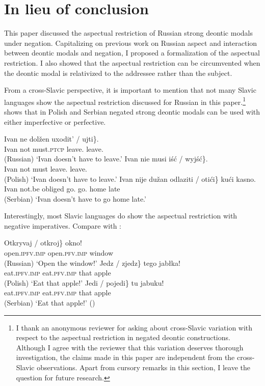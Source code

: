 \documentclass[output=paper,
modfonts,
newtxmath,colorlinks,citecolor=brown
]{langscibook}
\begin{document}
\section{In lieu of conclusion}\label{sect:conclusion}
This paper discussed the aspectual restriction of Russian strong deontic  modals under negation. Capitalizing on previous work on Russian aspect and interaction between deontic modals and negation, I proposed a formalization of the aspectual restriction. I also showed that the aspectual restriction can be circumvented when the deontic modal is relativized to the addressee rather than the subject.

From a cross-Slavic perspective, it is important to mention that not many Slavic languages show the aspectual restriction discussed for Russian in this paper.\footnote{I thank an anonymous reviewer for asking about cross-Slavic variation with respect to the aspectual restriction in negated deontic constructions. Although I agree with the reviewer that this variation deserves thorough investigation, the claims made in this paper are independent from the cross-Slavic observations. Apart from cursory remarks in this section, I leave the question for future research. 
}
 shows that in Polish and Serbian negated strong deontic modals can be used with either imperfective or perfective. 

\ea \label{crossslavdeon} \ea \gll Ivan ne dolžen \minsp{\{} uxodit' / \minsp{*} ujti\}. \\
	Ivan  not must.\textsc{ptcp} {} {leave.\im} {} {} {leave.\p} {} \\ \hfill (Russian) 
	\glt `Ivan doesn't have to leave.' 
	\ex \gll Ivan nie musi \minsp{\{} iść / wyjść\}. \\
	Ivan not must {} {leave.\im} {} {leave.\p} {} \\ \hfill (Polish)
	\glt `Ivan doesn't have to leave.' 
	\ex \gll Ivan nije du\v zan \minsp{\{} odlaziti / otići\} kući kasno. \\
	Ivan not.be obliged {} {go.\im} {} {go.\p} home late \\ \hfill (Serbian)
	\glt `Ivan doesn't have to go home late.' 
	\z \z             
            
\noindent Interestingly, most Slavic languages do show the aspectual restriction with negative imperatives. Compare  with :  

\ea \label{crossslavimp} \ea \gll \minsp{\{} Otkryvaj / otkroj\} okno! \\
  	{} open.\textsc{ipfv.imp} {} open.\textsc{pfv.imp}  window \\ \hfill (Russian)
 	\glt `Open the window!' 
    \ex \gll \minsp{\{} Jedz / zjedz\} tego jabłka! \\
	{} eat.\textsc{ipfv.imp} {} eat.\textsc{pfv.imp} that apple\\ \hfill (Polish)
	\glt `Eat that apple!' 
    \ex \gll \minsp{\{} Jedi / pojedi\} tu jabuku! \\		
	{} eat.\textsc{ipfv.imp} {} eat.\textsc{pfv.imp} that apple\\ \hfill (Serbian)
	\glt `Eat that apple!' \hfill (\citealt[2]{des16})
    \z \z 
       
\end{document}
